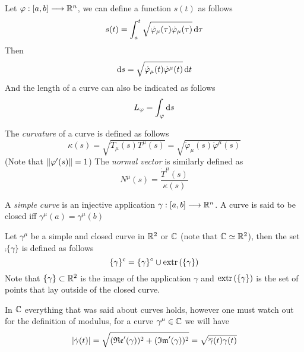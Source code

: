 \documentclass[../complete.tex]{subfiles}
\begin{document}
\begin{dfn}
	Let $\varphi:[a,b]\overset{}{\longrightarrow}\mathbb{R}^n$, we can define a function $s(t)$ as follows
	\begin{equation}
		s(t)=\int_{a}^{t}\sqrt{\dot{\varphi}_\mu(\tau)\dot{\varphi}_\mu(\tau)}\operatorname{d\!}{\tau}
		\label{eq:curvcoord}
	\end{equation}
	Then
	\begin{equation}
		\operatorname{d\!}{s}=\sqrt{\dot{\varphi}_\mu(t)\dot{\varphi}^\mu(t)}\operatorname{d\!}{t}
		\label{eq:diffcurvcoord}
	\end{equation}
	And the length of a curve can also be indicated as follows
	\begin{equation}
		L_\varphi=\int_\varphi\operatorname{d\!}{s}
		\label{eq:curvelength2}
	\end{equation}
\end{dfn}
\begin{dfn}
	The \textit{curvature} of a curve is defined as follows
	\begin{equation}
		\kappa(s)=\sqrt{T_\mu(s)T^\mu(s)}=\sqrt{\ddot{\varphi}_\mu(s)\ddot{\varphi}^\mu(s)}
		\label{eq:curvature}
	\end{equation}
	(Note that $\norm{\varphi'(s)}=1$)
	The \textit{normal vector} is similarly defined as
	\begin{equation}
		N^\mu(s)=\frac{\dot{T}^\mu(s)}{\kappa(s)}
		\label{eq:normalcurve}
	\end{equation}
\end{dfn}
\begin{dfn}
	A \textit{simple curve} is an injective application $\gamma:[a,b]\overset{}{\longrightarrow}\mathbb{R}^n$. A curve is said to be closed iff $\gamma^\mu(a)=\gamma^\mu(b)$
\end{dfn}
\begin{thm}
	Let $\gamma^\mu$ be a simple and closed curve in $\mathbb{R}^2$ or $\mathbb{C}$ (note that $\mathbb{C}\simeq\mathbb{R}^2$), then the set $\comp{\{\gamma\}}$ is defined as follows
	\begin{equation}
		\{\gamma\}^{\mathrm{c}}=\{\gamma\}^{\circ}\cup\operatorname{extr}{(\{\gamma\})}
		\label{eq:jordanthm}
	\end{equation}
	Note that $\{\gamma\}\subset\mathbb{R}^2$ is the image of the application $\gamma$ and $\operatorname{extr}{(\{\gamma\})}$ is the set of points that lay outside of the closed curve.
\end{thm}
In $\mathbb{C}$ everything that was said about curves holds, however one must watch out for the definition of modulus, for a curve $\gamma^\mu\in\mathbb{C}$ we will have
\begin{equation}
	\abs{\dot{\gamma}(t)}=\sqrt{(\mathfrak{Re}'(\gamma))^2+(\mathfrak{Im}'(\gamma))^2}=\sqrt{\overline{\gamma}(t)\gamma(t)}
	\label{eq:abscfgamma}
\end{equation}
\end{document}
